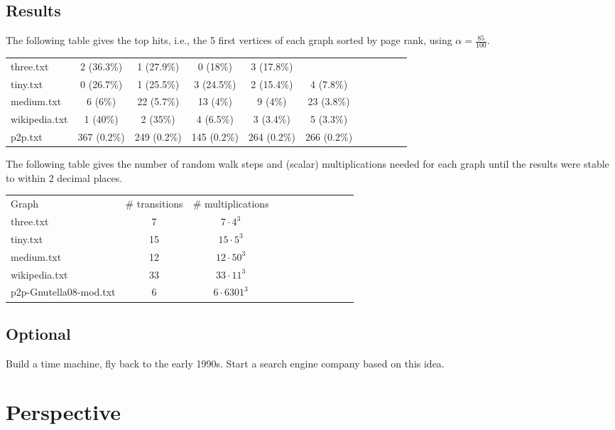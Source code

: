 \documentclass{tufte-handout}
\begin{document}
\subsection{Results}

The following table gives the top hits, i.e., the 5 first vertices of
each graph sorted by page rank, using $\alpha = \frac{85}{100}$.

\medskip
\begin{fullwidth}
\small
\begin{tabular}{lcccccccccc}
three.txt & 2 (36.3\%) & 1 (27.9\%) & 0 (18\%) & 3 (17.8\%) \\
tiny.txt & 0 (26.7\%) & 1 (25.5\%) & 3 (24.5\%) & 2 (15.4\%) & 4 (7.8\%)\\
medium.txt & 6 (6\%) & 22 (5.7\%) & 13 (4\%) & 9 (4\%) & 23 (3.8\%)\\
wikipedia.txt & 1 (40\%) & 2 (35\%) & 4 (6.5\%) & 3 (3.4\%) & 5 (3.3\%)\\
p2p.txt & 367 (0.2\%) & 249 (0.2\%) & 145 (0.2\%) & 264 (0.2\%) & 266 (0.2\%)\\
\end{tabular}
\end{fullwidth}

\bigskip The following table gives the number of random walk steps and
(scalar) multiplications needed for each graph until the results were
stable to within 2 decimal places.

\medskip
\begin{fullwidth}
\small
\begin{tabular}{lcccccccccc}
Graph & \# transitions  & \# multiplications \\
three.txt & 7 & $7 \cdot 4^3$\\
tiny.txt & 15 & $15 \cdot 5^3$\\
medium.txt & 12 & $12 \cdot 50^3$\\
wikipedia.txt & 33 & $33 \cdot 11^3$\\
p2p-Gnutella08-mod.txt & 6 & $6 \cdot 6301^3$
\end{tabular}
\end{fullwidth}

\subsection{Optional}

Build a time machine, fly back to the early 1990s.
Start a search engine company based on this idea.


\section{Perspective}
\end{document}
